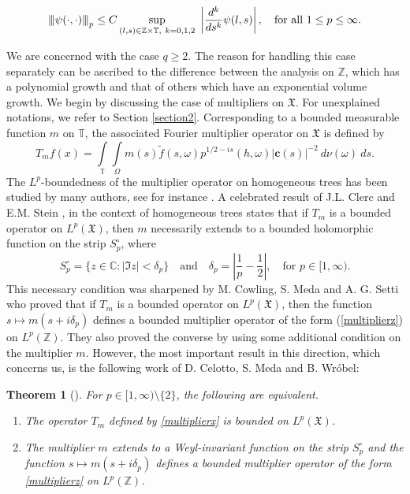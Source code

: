 \documentclass[12pt,reqno]{amsart}
\newcommand{\vertiii}[1]{{\left\vert\kern-0.25ex\left\vert\kern-0.25ex\left\vert #1 
		\right\vert\kern-0.25ex\right\vert\kern-0.25ex\right\vert}}
\newcommand{\C}{\mathbb C}
\newtheorem{theorem}{Theorem}[section]
\theoremstyle{definition}
\theoremstyle{definition}
\numberwithin{equation}{section}
\begin{document}
\begin{equation}\label{cvonz}
\vertiii{\psi(\cdot,\cdot)}_{p}\leq C\sup\limits_{(l,s)\in\mathbb{Z}\times\mathbb{T},~k=0,1,2}~\left|\frac{d^{k}}{ds^{k}}\psi(l,s)\right|,\quad\text{for all }1\leq p\leq\infty.
\end{equation}

We are concerned with the case $q\geq 2$. The reason for handling this case separately can be ascribed to the difference between the analysis on $\mathbb{Z}$, which has a polynomial growth and that of others which have an exponential volume growth. We begin by discussing the case of multipliers on $\mathfrak{X}$. For unexplained notations, we refer to Section \ref{section2}. Corresponding to a bounded measurable function $m$ on $\mathbb{T}$, the associated Fourier multiplier operator on $\mathfrak{X}$ is defined by
\begin{equation}\label{multiplierx}
T_{m}f(x)=\int\limits_{\mathbb{T}}\int\limits_{\Omega} m(s)\widetilde{f}(s,\omega)p^{1/2-is}(h,\omega)|\mathbf{c}(s)|^{-2}~d\nu(\omega)~ds.
\end{equation}
The $L^{p}$-boundedness of the multiplier operator on homogeneous trees has been studied by many authors, see for instance \cite{Meda_Stefano_2019,Cowling_Meda_98,Cowling_Meda_99}. A celebrated result of J.L. Clerc and E.M. Stein \cite{Clerc_Stein}, in the context of homogeneous trees states that if $T_{m}$ is a bounded operator on $L^{p}(\mathfrak{X})$, then $m$ necessarily extends to a bounded holomorphic function on the strip $S_{p}^{\circ}$, where
$$S_{p}^{\circ}=\{z\in\C: |\Im z|<\delta_p\}\quad\text{and}\quad \delta_p=\left|\frac{1}{p}-\frac{1}{2}\right|,\quad\text{for }p\in[1,\infty).$$
This necessary condition was sharpened by M. Cowling, S. Meda and A. G. Setti \cite[Theorem 2.1]{Cowling_Meda_99} who proved that if $T_{m}$ is a bounded operator on $L^{p}(\mathfrak{X})$, then the function $s\mapsto m(s+i\delta_{p})$ defines a bounded multiplier operator of the form (\ref{multiplierz}) on $L^{p}(\mathbb{Z})$. They also proved the converse by using some additional condition on the multiplier $m$. However, the most important result in this direction, which concerns us, is the following work of D. Celotto,  S. Meda and B. Wr\'{o}bel:

\begin{theorem}[{{\cite[Page 176]{Meda_Stefano_2019}}}]\label{multipliermainresult}
For $p\in[1,\infty)\setminus\{2\}$, the following are equivalent.
\begin{enumerate}
\item The operator $T_{m}$ defined by \eqref{multiplierx} is bounded on $L^{p}(\mathfrak{X})$.
\item The multiplier $m$ extends to a Weyl-invariant function on the strip $S_{p}^{\circ}$ and the function $s\mapsto m(s+i\delta_{p})$ defines a bounded multiplier operator of the form \eqref{multiplierz} on $L^{p}(\mathbb{Z})$.
\end{enumerate}
\end{theorem}
\end{document}
